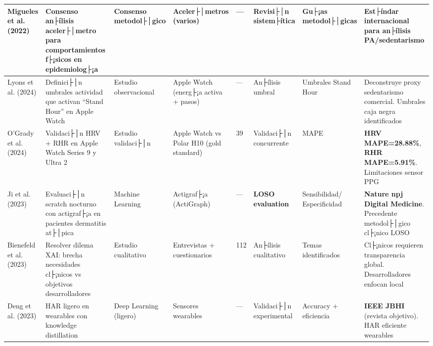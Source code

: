 \begin{landscape}
\begin{longtable}{@{}p{1.8cm}p{2.5cm}p{1.8cm}p{1.5cm}p{0.9cm}p{1.3cm}p{2.0cm}p{1.8cm}@{}}
\midrule

Migueles et al. (2022) \cite{Migueles2022GRANADA} & 
Consenso an├ílisis aceler├│metro para comportamientos f├¡sicos en epidemiolog├¡a & 
Consenso metodol├│gico & 
Aceler├│metros (varios) & 
--- & 
Revisi├│n sistem├ítica & 
Gu├¡as metodol├│gicas & 
Est├índar internacional para an├ílisis PA/sedentarismo \\

\midrule


Lyons et al. (2024) \cite{Lyons2024StandHour} & 
Definici├│n umbrales actividad que activan ``Stand Hour'' en Apple Watch & 
Estudio observacional & 
Apple Watch (energ├¡a activa + pasos) & 
--- & 
An├ílisis umbral & 
Umbrales Stand Hour & 
Deconstruye proxy sedentarismo comercial. Umbrales caja negra identificados \\

\midrule

O'Grady et al. (2024) \cite{OGrady2024AppleWatch} & 
Validaci├│n HRV + RHR en Apple Watch Series 9 y Ultra 2 & 
Estudio validaci├│n & 
Apple Watch vs Polar H10 (gold standard) & 
39 & 
Validaci├│n concurrente & 
MAPE & 
\textbf{HRV MAPE=28.88\%}, \textbf{RHR MAPE=5.91\%}. Limitaciones sensor PPG \\

\midrule

Ji et al. (2023) \cite{Ji2023Scratch} & 
Evaluaci├│n scratch nocturno con actigraf├¡a en pacientes dermatitis at├│pica & 
Machine Learning & 
Actigraf├¡a (ActiGraph) & 
--- & 
\textbf{LOSO evaluation} & 
Sensibilidad/ Especificidad & 
\textbf{Nature npj Digital Medicine}. Precedente metodol├│gico cl├¡nico LOSO \\

\midrule


Bienefeld et al. (2023) \cite{Bienefeld2023XAI} & 
Resolver dilema XAI: brecha necesidades cl├¡nicos vs objetivos desarrolladores & 
Estudio cualitativo & 
Entrevistas + cuestionarios & 
112 & 
An├ílisis cualitativo & 
Temas identificados & 
Cl├¡nicos requieren transparencia global. Desarrolladores enfocan local \\

\midrule

Deng et al. (2023) \cite{Deng2023LharJBHI} & 
HAR ligero en wearables con knowledge distillation & 
Deep Learning (ligero) & 
Sensores wearables & 
--- & 
Validaci├│n experimental & 
Accuracy + eficiencia & 
\textbf{IEEE JBHI} (revista objetivo). HAR eficiente wearables \\


\end{longtable}
\end{landscape}
